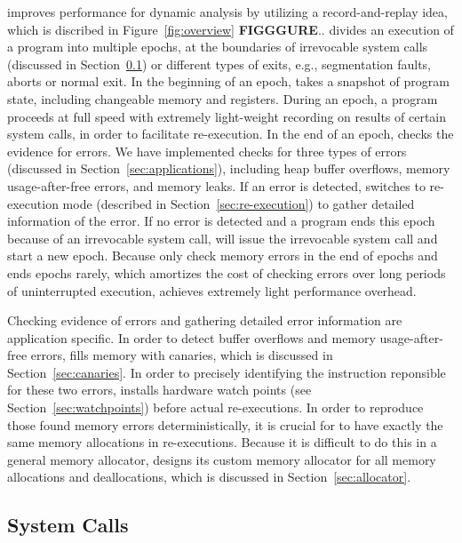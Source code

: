\label{sec:overview}

\DoubleTake{} improves performance for dynamic analysis by utilizing a record-and-replay idea, 
which is discribed in Figure~\ref{fig:overview} {\bf FIGGGURE}.. 
\DoubleTake{} divides an execution of a program into multiple epochs, at the boundaries of irrevocable
system calls (discussed in Section~\ref{sec:syscall}) or different types of exits, e.g., 
segmentation faults, aborts or normal exit.
In the beginning of an epoch, \doubletake{} takes a snapshot of program state, 
including changeable memory and registers.
During an epoch, a program proceeds at full speed with extremely light-weight recording on results of
certain system calls, in order to facilitate re-execution. 
In the end of an epoch, \doubletake{} checks the evidence for errors. 
We have implemented checks for three types of errors (discussed in Section~\ref{sec:applications}), 
including heap buffer overflows, memory usage-after-free errors, and memory leaks. 
If an error is detected, 
\doubletake{} switches to re-execution mode (described in Section~\ref{sec:re-execution}) 
to gather detailed information of the error.
If no error is detected and a program ends this epoch because of an irrevocable system call, 
\doubletake{} will issue the irrevocable system call and start a new epoch.
Because \doubletake{} only check memory errors in the end of epochs and ends epochs rarely, 
which amortizes the cost of checking errors over 
long periods of uninterrupted execution, 
\doubletake{} achieves extremely light performance overhead.

Checking evidence of errors and gathering detailed error information are application specific. 
In order to detect buffer overflows and memory usage-after-free errors, \doubletake{} fills 
memory with canaries, which is discussed in Section~\ref{sec:canaries}.
In order to precisely identifying the instruction reponsible for these two errors, 
\DoubleTake{} installs hardware watch points (see Section~\ref{sec:watchpoints}) before 
actual re-executions. 
In order to reproduce those found memory errors deterministically, 
it is crucial for \doubletake{} to have exactly the same memory allocations in re-executions. 
Because it is difficult to do this in a general memory allocator,
\DoubleTake{} designs its custom memory allocator for all memory allocations and deallocations, 
which is discussed in Section~\ref{sec:allocator}. 

\subsection{System Calls}
\label{sec:syscall}

